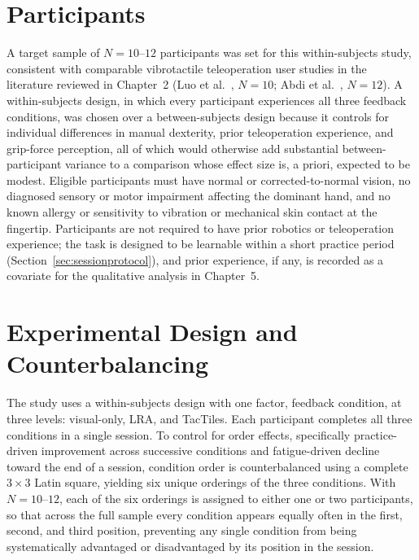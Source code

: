 \documentclass[12pt, a4paper]{report}
\begin{document}
\section{Participants}
\label{sec:participants}
A target sample of $N = 10$--$12$ participants was set for this within-subjects study, consistent with comparable vibrotactile teleoperation user studies in the literature reviewed in Chapter~2 (Luo et al.\ \cite{luo2024}, $N=10$; Abdi et al.\ \cite{abdi2020}, $N=12$). A within-subjects design, in which every participant experiences all three feedback conditions, was chosen over a between-subjects design because it controls for individual differences in manual dexterity, prior teleoperation experience, and grip-force perception, all of which would otherwise add substantial between-participant variance to a comparison whose effect size is, a priori, expected to be modest. Eligible participants must have normal or corrected-to-normal vision, no diagnosed sensory or motor impairment affecting the dominant hand, and no known allergy or sensitivity to vibration or mechanical skin contact at the fingertip. Participants are not required to have prior robotics or teleoperation experience; the task is designed to be learnable within a short practice period (Section~\ref{sec:sessionprotocol}), and prior experience, if any, is recorded as a covariate for the qualitative analysis in Chapter~5.

\section{Experimental Design and Counterbalancing}
\label{sec:design}
The study uses a within-subjects design with one factor, feedback condition, at three levels: visual-only, LRA, and TacTiles. Each participant completes all three conditions in a single session. To control for order effects, specifically practice-driven improvement across successive conditions and fatigue-driven decline toward the end of a session, condition order is counterbalanced using a complete $3\times3$ Latin square, yielding six unique orderings of the three conditions. With $N=10$--$12$, each of the six orderings is assigned to either one or two participants, so that across the full sample every condition appears equally often in the first, second, and third position, preventing any single condition from being systematically advantaged or disadvantaged by its position in the session.
\end{document}
